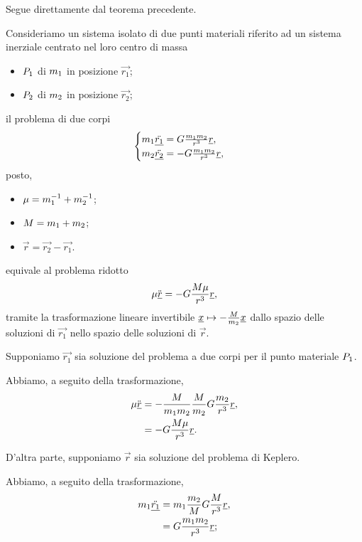 \Proof Segue direttamente dal teorema precedente.
\begin{Theorem}
	\label{ElementiDiMeccanicaCeleste_RiduzioneAlProblemaDiKeplero}
	Consideriamo un sistema isolato di due punti materiali riferito ad un sistema inerziale centrato nel loro centro di massa
	\begin{itemize}
		\item $P_1$ di $m_1$ in posizione $\vec{r_1}$;
		\item $P_2$ di $m_2$ in posizione $\vec{r_2}$;
	\end{itemize}
	il problema di due corpi
	\[
		\begin{cases}
			m_1 \ddot{\underline{r_1}} = G \frac{m_1m_2}{r^3}\underline{r},\\
			m_2 \ddot{\underline{r_2}} = - G \frac{m_1m_2}{r^3}\underline{r},
		\end{cases}
	\]
	posto,
	\begin{itemize}
		\item $\mu = m_1^{-1} + m_2^{-1}$;
		\item $M = m_1 + m_2$;
		\item $\vec{r} = \vec{r_2} - \vec{r_1}$.
	\end{itemize}
	equivale al problema ridotto
	\[
		\mu \ddot{\underline{r}} = - G \frac{M\mu}{r^3}\underline{r},
	\]
	tramite la trasformazione lineare invertibile $\underline{x} \mapsto - \frac{M}{m_2} \underline{x}$ dallo spazio delle soluzioni di $\vec{r_1}$ nello spazio delle soluzioni di $\vec{r}$.
\end{Theorem}
\Proof Supponiamo $\vec{r_1}$ sia soluzione del problema a due corpi per il punto materiale $P_1$.
\par Abbiamo, a seguito della trasformazione,
\begin{align*}
	\mu \ddot{\underline{r}}
	&= - \frac{M}{m_1m_2} \frac{M}{m_2} G \frac{m_2}{r^3}\underline{r},\\
	&= - G \frac{M\mu}{r^3}\underline{r}.
\end{align*}
\par D'altra parte, supponiamo $\vec{r}$ sia soluzione del problema di Keplero.
\par Abbiamo, a seguito della trasformazione,
\begin{align*}
	m_1 \ddot{\underline{r_1}}
	&= m_1 \frac{m_2}{M} G \frac{M}{r^3}\underline{r},\\
	&= G \frac{m_1m_2}{r^3}\underline{r};
\end{align*}
